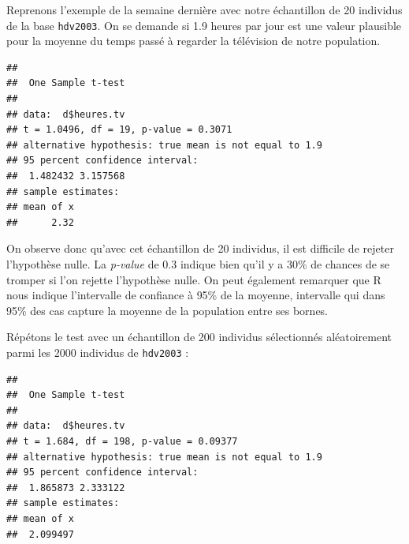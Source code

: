 \documentclass[
  french,
]{book}
\newenvironment{Shaded}{\begin{snugshade}}{\end{snugshade}}
\newcommand{\AttributeTok}[1]{\textcolor[rgb]{0.77,0.63,0.00}{#1}}
\newcommand{\FloatTok}[1]{\textcolor[rgb]{0.00,0.00,0.81}{#1}}
\newcommand{\FunctionTok}[1]{\textcolor[rgb]{0.00,0.00,0.00}{#1}}
\newcommand{\NormalTok}[1]{#1}
\newcommand{\OtherTok}[1]{\textcolor[rgb]{0.56,0.35,0.01}{#1}}
\newcommand{\SpecialCharTok}[1]{\textcolor[rgb]{0.00,0.00,0.00}{#1}}
\begin{document}
Reprenons l'exemple de la semaine dernière avec notre échantillon de 20 individus de la base \texttt{hdv2003}. On se demande si 1.9 heures par jour est une valeur plausible pour la moyenne du temps passé à regarder la télévision de notre population.

\begin{Shaded}
\end{Shaded}

\begin{verbatim}
## 
##  One Sample t-test
## 
## data:  d$heures.tv
## t = 1.0496, df = 19, p-value = 0.3071
## alternative hypothesis: true mean is not equal to 1.9
## 95 percent confidence interval:
##  1.482432 3.157568
## sample estimates:
## mean of x 
##      2.32
\end{verbatim}

On observe donc qu'avec cet échantillon de 20 individus, il est difficile de rejeter l'hypothèse nulle. La \emph{p-value} de 0.3 indique bien qu'il y a 30\% de chances de se tromper si l'on rejette l'hypothèse nulle. On peut également remarquer que R nous indique l'intervalle de confiance à 95\% de la moyenne, intervalle qui dans 95\% des cas capture la moyenne de la population entre ses bornes.

Répétons le test avec un échantillon de 200 individus sélectionnés aléatoirement parmi les 2000 individus de \texttt{hdv2003} :

\begin{Shaded}
\end{Shaded}

\begin{verbatim}
## 
##  One Sample t-test
## 
## data:  d$heures.tv
## t = 1.684, df = 198, p-value = 0.09377
## alternative hypothesis: true mean is not equal to 1.9
## 95 percent confidence interval:
##  1.865873 2.333122
## sample estimates:
## mean of x 
##  2.099497
\end{verbatim}
\end{document}
